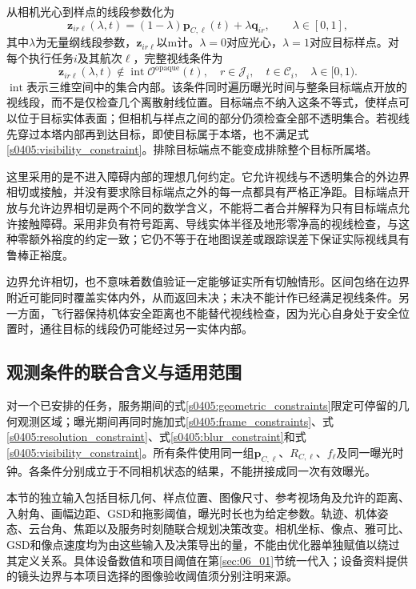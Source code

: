 从相机光心到样点的线段参数化为
\begin{equation}
 \mathbf z_{ir\ell}(\lambda,t)
 =(1-\lambda)\mathbf p_{C,\ell}(t)+\lambda\mathbf q_{ir},
 \qquad \lambda\in[0,1],
 \label{s0405:sight_segment}
\end{equation}
其中$\lambda$为无量纲线段参数，$\mathbf z_{ir\ell}$以$\mathrm m$计。$\lambda=0$对应光心，$\lambda=1$对应目标样点。对每个执行任务$i$及其航次$\ell$，完整视线条件为
\begin{equation}
 \mathbf z_{ir\ell}(\lambda,t)
 \notin\operatorname{int}\mathcal O^{\mathrm{opaque}}(t),
 \quad r\in\mathcal J_i,\quad
 t\in\mathcal C_i,\quad \lambda\in[0,1).
 \label{s0405:visibility_constraint}
\end{equation}
$\operatorname{int}$表示三维空间中的集合内部。该条件同时遍历曝光时间与整条目标端点开放的视线段，而不是仅检查几个离散射线位置。目标端点不纳入这条不等式，使样点可以位于目标实体表面；但相机与样点之间的部分仍须检查全部不透明集合。若视线先穿过本塔内部再到达目标，即使目标属于本塔，也不满足式\eqref{s0405:visibility_constraint}。排除目标端点不能变成排除整个目标所属塔。

这里采用的是不进入障碍内部的理想几何约定。它允许视线与不透明集合的外边界相切或接触，并没有要求除目标端点之外的每一点都具有严格正净距。目标端点开放与允许边界相切是两个不同的数学含义，不能将二者合并解释为只有目标端点允许接触障碍。采用非负有符号距离、导线实体半径及地形零净高的视线检查，与这种零额外裕度的约定一致；它仍不等于在地图误差或跟踪误差下保证实际视线具有鲁棒正裕度。

边界允许相切，也不意味着数值验证一定能够证实所有切触情形。区间包络在边界附近可能同时覆盖实体内外，从而返回未决；未决不能计作已经满足视线条件。另一方面，飞行器保持机体安全距离也不能替代视线检查，因为光心自身处于安全位置时，通往目标的线段仍可能经过另一实体内部。

\subsection{观测条件的联合含义与适用范围}

对一个已安排的任务，服务期间的式\eqref{s0405:geometric_constraints}限定可停留的几何观测区域；曝光期间再同时施加式\eqref{s0405:frame_constraints}、式\eqref{s0405:resolution_constraint}、式\eqref{s0405:blur_constraint}和式\eqref{s0405:visibility_constraint}。所有条件使用同一组$\mathbf p_{C,\ell}$、$R_{C,\ell}$、$f_\ell$及同一曝光时钟。各条件分别成立于不同相机状态的结果，不能拼接成同一次有效曝光。

本节的独立输入包括目标几何、样点位置、图像尺寸、参考视场角及允许的距离、入射角、画幅边距、GSD和拖影阈值，曝光时长也为给定参数。轨迹、机体姿态、云台角、焦距以及服务时刻随联合规划决策改变。相机坐标、像点、雅可比、GSD和像点速度均为由这些输入及决策导出的量，不能由优化器单独赋值以绕过其定义关系。具体设备数值和项目阈值在第\ref{sec:06_01}节统一代入；设备资料\cite{DJIH20}提供的镜头边界与本项目选择的图像验收阈值须分别注明来源。

